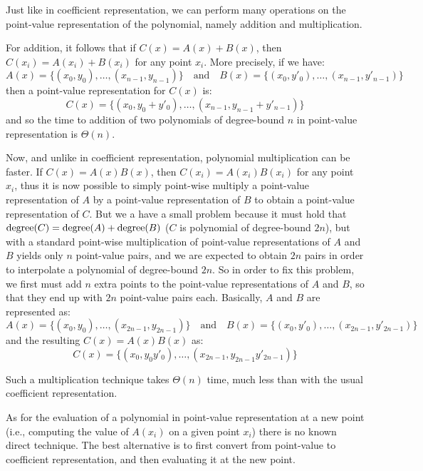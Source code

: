 Just like in coefficient representation, we can perform many operations on the
point-value representation of the polynomial, namely addition and
multiplication.

For addition, it follows that if $C(x) = A(x) + B(x)$, then $C(x_i) = A(x_i)
+ B(x_i)$ for any point $x_i$. More precisely, if we have:
\begin{equation*}
  A(x) = \{(x_0, y_0), \dotsc, (x_{n - 1}, y_{n - 1})\}
  \quad \text{and} \quad
  B(x) = \{(x_0, y'_0), \dotsc, (x_{n - 1}, y'_{n - 1})\}
\end{equation*}
then a point-value representation for $C(x)$ is:
\begin{equation*}
  C(x) = \{(x_0, y_0 + y'_0), \dotsc, (x_{n - 1}, y_{n - 1} + y'_{n - 1})\}
\end{equation*}
and so the time to addition of two polynomials of degree-bound $n$ in
point-value representation is $\Theta(n)$.

Now, and unlike in coefficient representation, polynomial multiplication can be
faster. If $C(x) = A(x) B(x)$, then $C(x_i) = A(x_i) B(x_i)$ for any point
$x_i$, thus it is now possible to simply point-wise multiply a point-value
representation of $A$ by a point-value representation of $B$ to obtain
a point-value representation of $C$. But we a have a small problem because it
must hold that $\operatorname{degree}(C) = \operatorname{degree}(A) + \operatorname{degree}(B)$ ($C$ is polynomial of
degree-bound $2n$), but with a standard point-wise multiplication of
point-value representations of $A$ and $B$ yields only $n$ point-value pairs,
and we are expected to obtain $2n$ pairs in order to interpolate a polynomial
of degree-bound $2n$. So in order to fix this problem, we first must add $n$
extra points to the point-value representations of $A$ and $B$, so that they
end up with $2n$ point-value pairs each. Basically, $A$ and $B$ are represented
as:
\begin{equation*}
  A(x) = \{(x_0, y_0), \dotsc, (x_{2n - 1}, y_{2n - 1})\}
  \quad \text{and} \quad
  B(x) = \{(x_0, y'_0), \dotsc, (x_{2n - 1}, y'_{2n - 1})\}
\end{equation*}
and the resulting $C(x) = A(x) B(x)$ as:
\begin{equation*}
  C(x) = \{(x_0, y_0 y'_0), \dotsc, (x_{2n - 1}, y_{2n - 1} y'_{2n - 1})\}
\end{equation*}

Such a multiplication technique takes $\Theta(n)$ time, much less than with the
usual coefficient representation.

As for the evaluation of a polynomial in point-value representation at a new
point (i.e., computing the value of $A(x_i)$ on a given point $x_i$) there is
no known direct technique. The best alternative is to first convert from
point-value to coefficient representation, and then evaluating it at the new
point.


